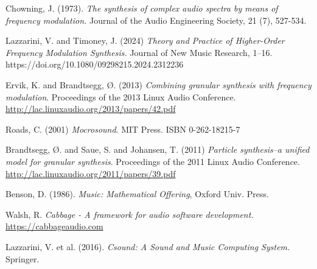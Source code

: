\documentclass[runningheads,a4paper]{llncs}
\begin{document}
\begin{thebibliography}{99}

 Chowning, J. (1973). \emph{The synthesis of complex audio spectra by means of frequency modulation.} Journal of the Audio Engineering Society, 21 (7), 527-534.
	
 Lazzarini, V. and Timoney, J. (2024) \emph{Theory and Practice of Higher-Order Frequency Modulation Synthesis.} Journal of New Music Research, 1–16. https://doi.org/10.1080/09298215.2024.2312236

 Ervik, K. and Brandtsegg, Ø. (2013) \emph{Combining granular synthesis with frequency modulation}. Proceedings of the 2013 Linux Audio Conference. \url{http://lac.linuxaudio.org/2013/papers/42.pdf}

 Roads, C. (2001) \emph{Mocrosound}. MIT Press.  ISBN 0-262-18215-7

 Brandtsegg, Ø. and Saue, S. and Johansen, T. (2011) \emph{Particle synthesis–a unified model for granular synthesis}. Proceedings of the 2011 Linux Audio Conference. \url{http://lac.linuxaudio.org/2011/papers/39.pdf}

 Benson, D. (1986).\emph{ Music: Mathematical Offering}, Oxford Univ. Press.

 Walsh, R. \emph{Cabbage - A framework for audio software development.} \url{https://cabbageaudio.com}

 Lazzarini, V. et al. (2016). \emph{Csound: A Sound and Music Computing System.} Springer.



\end{thebibliography}
\end{document}

